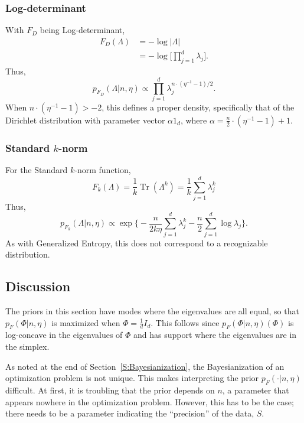 \documentclass{article}
\DeclareMathOperator*{\Tr}{Tr}
\begin{document}
\subsubsection*{Log-determinant}

With $F_D$ being Log-determinant,
\begin{align*}
    F_D(\Lambda)
        &= -\log |\Lambda| \\
        &= -\log \Big[ \prod_{j=1}^d \lambda_j \Big].
\end{align*}
Thus,
\[
    p_{F_D}(\Lambda | n, \eta)
        \propto
            \prod_{j=1}^d
                \lambda_j^{n \cdot (\eta^{-1} - 1)/2}.
\]
When $n \cdot (\eta^{-1} - 1) > -2$, this defines a proper density, specifically
that of the Dirichlet distribution with parameter vector $\alpha 1_d$, where
$\alpha = \tfrac{n}{2} \cdot (\eta^{-1} - 1) + 1$.


\subsubsection*{Standard $k$-norm}

For the Standard $k$-norm function,
\[
    F_k(\Lambda)
        = \frac{1}{k} \Tr(\Lambda^k)
        = \frac{1}{k} \sum_{j=1}^d \lambda_j^k
\]
Thus,
\[
    p_{F_k}(\Lambda | n, \eta)
        \propto
            \exp\Big\{
                -
                \frac{n}{2k \eta}
                \sum_{j=1}^{d} \lambda_j^k
                -
                \frac{n}{2}
                \sum_{j=1}^{d} \log \lambda_j
            \Big\}.
\]
As with Generalized Entropy, this does not correspond to a recognizable
distribution.


\subsection{Discussion}

The priors in this section have modes where the eigenvalues are all equal,
so that $p_F(\Phi|n, \eta)$ is maximized when $\Phi = \tfrac{1}{d} I_d$.  This
follows since $p_F(\Phi|n, \eta)(\Phi)$ is log-concave in the eigenvalues of
$\Phi$ and has support where the eigenvalues are in the simplex.

As noted at the end of Section~\ref{S:Bayesianization}, the Bayesianization of
an optimization problem is not unique.  This makes interpreting the prior
$p_F(\cdot | n, \eta)$ difficult.  At first, it is troubling that the prior
depends on $n$, a parameter that appears nowhere in the optimization problem.
However, this has to be the case; there needs to be a parameter indicating
the ``precision'' of the data, $S$.
\end{document}
